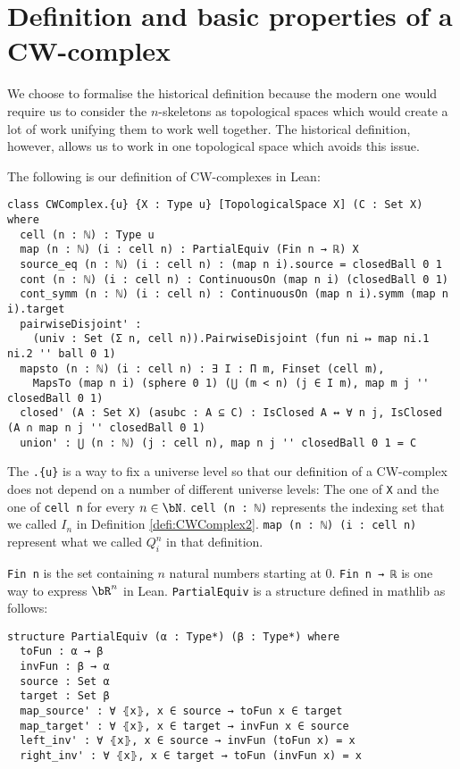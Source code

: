\section{Definition and basic properties of a CW-complex}

We choose to formalise the historical definition because the modern one would require us to consider the $n$-skeletons as topological spaces which would create a lot of work unifying them to work well together. 
The historical definition, however, allows us to work in one topological space which avoids this issue.  

The following is our definition of CW-complexes in Lean:

\begin{lstlisting}
class CWComplex.{u} {X : Type u} [TopologicalSpace X] (C : Set X) where
  cell (n : ℕ) : Type u
  map (n : ℕ) (i : cell n) : PartialEquiv (Fin n → ℝ) X
  source_eq (n : ℕ) (i : cell n) : (map n i).source = closedBall 0 1
  cont (n : ℕ) (i : cell n) : ContinuousOn (map n i) (closedBall 0 1)
  cont_symm (n : ℕ) (i : cell n) : ContinuousOn (map n i).symm (map n i).target
  pairwiseDisjoint' :
    (univ : Set (Σ n, cell n)).PairwiseDisjoint (fun ni ↦ map ni.1 ni.2 '' ball 0 1)
  mapsto (n : ℕ) (i : cell n) : ∃ I : Π m, Finset (cell m),
    MapsTo (map n i) (sphere 0 1) (⋃ (m < n) (j ∈ I m), map m j '' closedBall 0 1)
  closed' (A : Set X) (asubc : A ⊆ C) : IsClosed A ↔ ∀ n j, IsClosed (A ∩ map n j '' closedBall 0 1)
  union' : ⋃ (n : ℕ) (j : cell n), map n j '' closedBall 0 1 = C
\end{lstlisting}

The \lstinline|.{u}| is a way to fix a universe level so that our definition of a CW-complex does not depend on a number of different universe levels: The one of \lstinline{X} and the one of \lstinline{cell n} for every $n \in \bN$.
\lstinline{cell (n : ℕ)} represents the indexing set that we called $I_n$ in Definition \ref{defi:CWComplex2}. \lstinline{map (n : ℕ) (i : cell n)} represent what we called $Q_i^n$ in that definition.

\lstinline{Fin n} is the set containing $n$ natural numbers starting at 0.
\lstinline{Fin n → ℝ} is one way to express $\bR^n$ in Lean.
\lstinline{PartialEquiv} is a structure defined in mathlib as follows:

\begin{lstlisting}
structure PartialEquiv (α : Type*) (β : Type*) where
  toFun : α → β
  invFun : β → α
  source : Set α
  target : Set β
  map_source' : ∀ ⦃x⦄, x ∈ source → toFun x ∈ target
  map_target' : ∀ ⦃x⦄, x ∈ target → invFun x ∈ source
  left_inv' : ∀ ⦃x⦄, x ∈ source → invFun (toFun x) = x
  right_inv' : ∀ ⦃x⦄, x ∈ target → toFun (invFun x) = x
\end{lstlisting}


